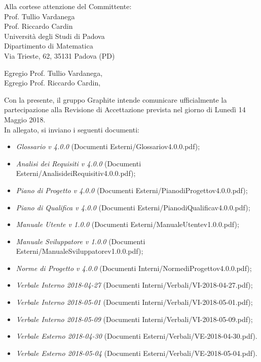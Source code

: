 \documentclass[]{letter}
\begin{document}
\begin{letter}{
		Alla cortese attenzione del Committente: \\
		Prof. Tullio Vardanega \\
		Prof. Riccardo Cardin \\
		Università degli Studi di Padova \\
		Dipartimento di Matematica \\ 
		Via Trieste, 62, 35131 Padova (PD)
	}

\opening{Egregio Prof. Tullio Vardanega, \\ Egregio Prof. Riccardo Cardin,}

\noindent Con la presente, il gruppo Graphite intende comunicare ufficialmente la partecipazione alla Revisione di Accettazione prevista nel giorno di Lunedì 14 Maggio 2018.\\
In allegato, si inviano i seguenti documenti:

\begin{itemize}
	\item \textit{Glossario v 4.0.0} (Documenti Esterni/Glossariov4.0.0.pdf);
	\item \textit{Analisi dei Requisiti v 4.0.0} (Documenti Esterni/AnalisideiRequisitiv4.0.0.pdf);
	\item \textit{Piano di Progetto v 4.0.0} (Documenti Esterni/PianodiProgettov4.0.0.pdf);
	\item \textit{Piano di Qualifica v 4.0.0} (Documenti Esterni/PianodiQualificav4.0.0.pdf);
	\item \textit{Manuale Utente v 1.0.0} (Documenti Esterni/ManualeUtentev1.0.0.pdf);
	\item \textit{Manuale Sviluppatore v 1.0.0} (Documenti Esterni/ManualeSviluppatorev1.0.0.pdf);
	
	\item \textit{Norme di Progetto v 4.0.0} (Documenti Interni/NormediProgettov4.0.0.pdf);
	
	
	\item \textit{Verbale Interno 2018-04-27} (Documenti Interni/Verbali/VI-2018-04-27.pdf);
	\item \textit{Verbale Interno 2018-05-01} (Documenti Interni/Verbali/VI-2018-05-01.pdf);
	\item \textit{Verbale Interno 2018-05-09} (Documenti Interni/Verbali/VI-2018-05-09.pdf);
	
	\item \textit{Verbale Esterno 2018-04-30} (Documenti Esterni/Verbali/VE-2018-04-30.pdf).
	\item \textit{Verbale Esterno 2018-05-04} (Documenti Esterni/Verbali/VE-2018-05-04.pdf).
\end{itemize}


\end{letter}
\end{document}
